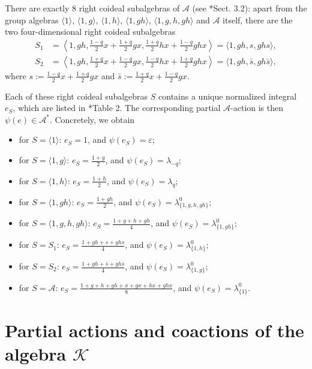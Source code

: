 \documentclass[reqno]{amsart}
\theoremstyle{definition}
\numberwithin{equation}{section}\theoremstyle{plain}
\theoremstyle{definition}
\def \K {\mathcal{K}}
\def \A {\mathcal{A}}
\begin{document}
There are exactly 8 right coideal subalgebras of \(\A\) (see \cite{DT}*{Sect. 3.2}): apart from the group algebras \(\langle 1 \rangle\), \(\langle 1, g \rangle\), \(\langle 1, h \rangle\), \(\langle 1, gh \rangle\), \(\langle 1, g, h, gh \rangle\) and \(\A\) itself, there are the two four-dimensional right coideal subalgebras
\begin{align*}
	S_1 &= \left\langle 1, gh, \frac{1-q}{2}x + \frac{1 + q}{2}gx, \frac{1 + q}{2}hx + \frac{1 - q}{2}ghx \right\rangle = \langle 1, gh, s, ghs \rangle, \\
	S_2 &= \left\langle 1, gh, \frac{1 + q}{2}x + \frac{1 - q}{2}gx, \frac{1 - q}{2}hx + \frac{1 + q}{2}ghx \right\rangle = \langle 1, gh, \bar{s}, gh \bar{s} \rangle,
\end{align*}
where \(s := \frac{1 - q}{2}x + \frac{1 + q}{2}gx\) and \(\bar{s} := \frac{1 + q}{2}x + \frac{1 - q}{2}gx\).

\smallbreak

Each of these right coideal subalgebras \(S\) contains a unique normalized integral \(e_S\), which are listed in \cite{BHSV}*{Table 2}. The corresponding partial \(\A\)-action is then \(\psi(e) \in \A^*\). 
Concretely, we obtain
\begin{itemize}
    \item for \(S = \langle 1 \rangle\): \(e_S = 1\), and \(\psi(e_S) = \varepsilon\);
    \item for \(S = \langle 1, g \rangle\): \(e_S = \frac{1 + g}{2}\), and \(\psi(e_S) = \lambda_{-q}\);
    \item for \(S = \langle 1, h \rangle\): \(e_S = \frac{1 + h}{2}\), and \(\psi(e_S) = \lambda_{q}\);
    \item for \(S = \langle 1, gh \rangle\): \(e_S = \frac{1 + gh}{2}\), and \(\psi(e_S) = \lambda^0_{\{1, g, h, gh\}}\);
    \item for \(S = \langle 1, g, h, gh \rangle\): \(e_S = \frac{1 + g + h+ gh}{4}\), and \(\psi(e_S) = \lambda^0_{\{1, gh\}}\);
    \item for \(S = S_1\): \(e_S = \frac{1 + gh + s+ ghs}{4}\), and \(\psi(e_S) = \lambda^0_{\{1, h\}}\);
    \item for \(S = S_2\): \(e_S = \frac{1 + gh + \bar{s}+ gh\bar{s}}{4}\), and \(\psi(e_S) = \lambda^0_{\{1, g\}}\);
    \item for \(S = \A\): \(e_S = \frac{1 + g + h+ gh + x + gx + hx + ghx}{8}\), and \(\psi(e_S) = \lambda^0_{\{1\}}\).
\end{itemize}


\section{Partial actions and coactions of the algebra \texorpdfstring{$\K$}{K}}\label{sec_K}
\end{document}
